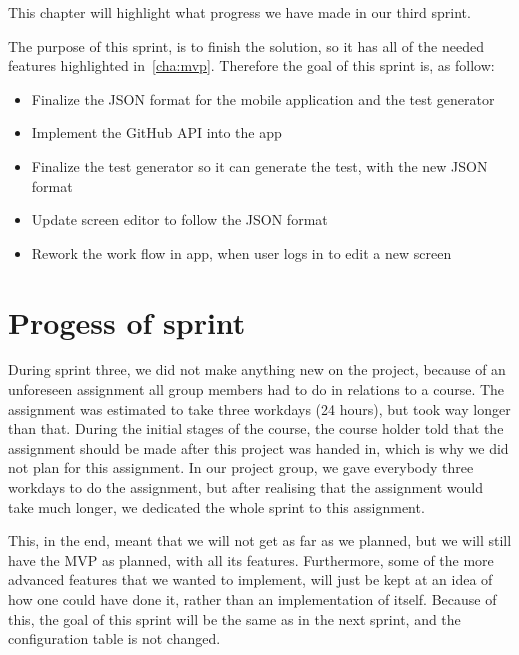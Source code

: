 This chapter will highlight what progress we have made in our third sprint.

The purpose of this sprint, is to finish the solution, so it has all of the needed features highlighted in~\autoref{cha:mvp}.
Therefore the goal of this sprint is, as follow:

\begin{itemize}
    \item Finalize the JSON format for the mobile application and the test generator
    \item Implement the GitHub API into the app
    \item Finalize the test generator so it can generate the test, with the new JSON format
    \item Update screen editor to follow the JSON format
    \item Rework the work flow in app, when user logs in to edit a new screen
\end{itemize}

\section{Progess of sprint}
During sprint three, we did not make anything new on the project, because of an unforeseen assignment all group members had to do in relations to a course.
The assignment was estimated to take three workdays (24 hours), but took way longer than that.
During the initial stages of the course, the course holder told that the assignment should be made after this project was handed in, which is why we did not plan for this assignment.
In our project group, we gave everybody three workdays to do the assignment, but after realising that the assignment would take much longer, we dedicated the whole sprint to this assignment.

This, in the end, meant that we will not get as far as we planned, but we will still have the MVP as planned, with all its features.
Furthermore, some of the more advanced features that we wanted to implement, will just be kept at an idea of how one could have done it, rather than an implementation of itself.
Because of this, the goal of this sprint will be the same as in the next sprint, and the configuration table is not changed.